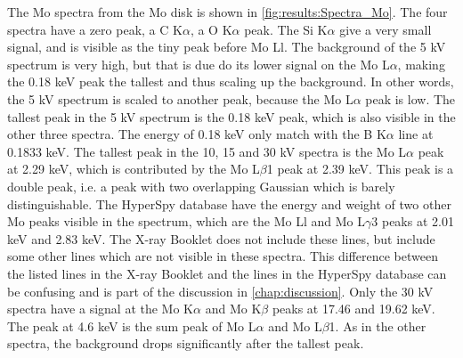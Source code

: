The Mo spectra from the Mo disk is shown in \cref{fig:results:Spectra_Mo}.
The four spectra have a zero peak, a C K$\alpha$, a O K$\alpha$ peak.
The Si K$\alpha$ give a very small signal, and is visible as the tiny peak before Mo Ll.
The background of the 5 kV spectrum is very high, but that is due do its lower signal on the Mo L$\alpha$, making the 0.18 keV peak the tallest and thus scaling up the background.
In other words, the 5 kV spectrum is scaled to another peak, because the Mo L$\alpha$ peak is low. %
The tallest peak in the 5 kV spectrum is the 0.18 keV peak, which is also visible in the other three spectra.
The energy of 0.18 keV only match with the B K$\alpha$ line at 0.1833 keV. %
The tallest peak in the 10, 15 and 30 kV spectra is the Mo L$\alpha$ peak at 2.29 keV, which is contributed by the Mo L$\beta$1 peak at 2.39 keV.
This peak is a double peak, i.e. a peak with two overlapping Gaussian which is barely distinguishable.
The HyperSpy database have the energy and weight of two other Mo peaks visible in the spectrum, which are the Mo Ll and Mo L$\gamma$3 peaks at 2.01 keV and 2.83 keV.
%
%
The X-ray Booklet does not include these lines, but include some other lines which are not visible in these spectra.
This difference between the listed lines in the X-ray Booklet and the lines in the HyperSpy database can be confusing and is part of the discussion in \cref{chap:discussion}. %
Only the 30 kV spectra have a signal at the Mo K$\alpha$ and Mo K$\beta$ peaks at 17.46 and 19.62 keV. %
The peak at 4.6 keV is the sum peak of Mo L$\alpha$ and Mo L$\beta$1.
As in the other spectra, the background drops significantly after the tallest peak.




